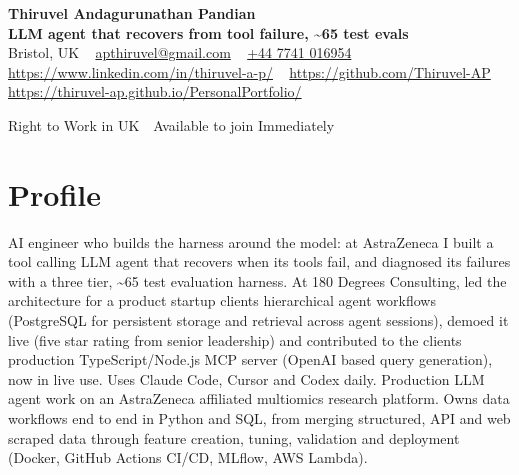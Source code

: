 \documentclass[a4paper,11pt]{article}
\begin{document}
\begin{center}
  {\LARGE\bfseries Thiruvel Andagurunathan Pandian} \\[3pt]
  {\color{headernavy}\small\textbf{LLM agent that recovers from tool failure, \textasciitilde{}65 test evals}} \\[3pt]
  {\small
  Bristol, UK\nobreak\ \,\textbar\, \href{mailto:apthiruvel@gmail.com}{apthiruvel@gmail.com}\nobreak\ \,\textbar\, \href{tel:+447741016954}{+44 7741 016954}\nobreak\ \,\textbar\, \href{https://www.linkedin.com/in/thiruvel-a-p/}{https://www.linkedin.com/in/thiruvel-a-p/}\nobreak\ \,\textbar\, \href{https://github.com/Thiruvel-AP}{https://github.com/Thiruvel-AP}\nobreak\ \,\textbar\, \href{https://thiruvel-ap.github.io/PersonalPortfolio/}{https://thiruvel-ap.github.io/PersonalPortfolio/}}\par\vspace{4pt}
  \noindent{} Right to Work in UK \,\textbar\, Available to join Immediately
\end{center}

\section{Profile}
AI engineer who builds the harness around the model: at AstraZeneca I built a tool calling LLM agent that recovers when its tools fail, and diagnosed its failures with a three tier, \textasciitilde{}65 test evaluation harness. At 180 Degrees Consulting, led the architecture for a product startup client\textquotesingle{}s hierarchical agent workflows (PostgreSQL for persistent storage and retrieval across agent sessions), demoed it live (five star rating from senior leadership) and contributed to the client\textquotesingle{}s production TypeScript/Node.js MCP server (OpenAI based query generation), now in live use. Uses Claude Code, Cursor and Codex daily. Production LLM agent work on an AstraZeneca affiliated multiomics research platform. Owns data workflows end to end in Python and SQL, from merging structured, API and web scraped data through feature creation, tuning, validation and deployment (Docker, GitHub Actions CI/CD, MLflow, AWS Lambda).
\end{document}
